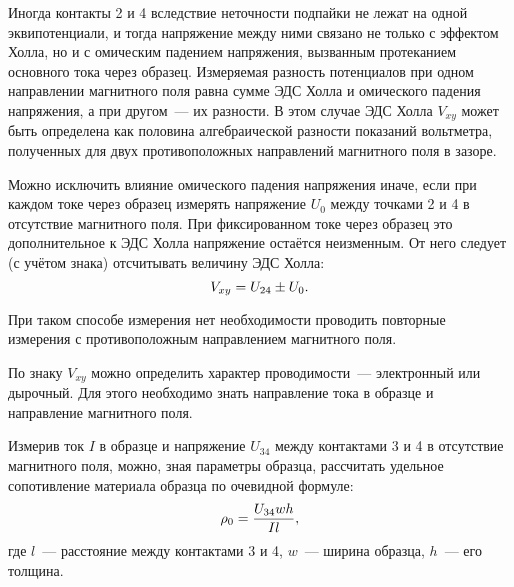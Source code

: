 Иногда контакты 2 и 4 вследствие неточности подпайки не лежат на одной эквипотенциали, и тогда напряжение между ними связано не только с эффектом Холла, но и с омическим падением напряжения, вызванным протеканием основного тока через образец. Измеряемая разность потенциалов при одном направлении магнитного поля равна сумме ЭДС Холла и омического падения напряжения, а при другом~--- их разности. В этом случае ЭДС Холла $V_{xy}$ может быть определена как половина алгебраической разности показаний вольтметра, полученных для двух противоположных направлений магнитного поля в зазоре.

Можно исключить влияние омического падения напряжения иначе, если при каждом токе через образец измерять
напряжение $U_0$ между точками 2 и 4 в отсутствие магнитного поля. При фиксированном токе через образец это
дополнительное к ЭДС Холла напряжение остаётся неизменным. От него следует (с учётом знака) отсчитывать величину
ЭДС Холла:
\begin{equation}
	V_{xy}=U_{24}\pm U_0.
	\eqmark{3.5.1}
\end{equation}

При таком способе измерения нет необходимости проводить повторные измерения с противоположным направлением магнитного поля.

По знаку $V_{xy}$ можно определить характер проводимости~--- электронный или дырочный. Для этого необходимо знать направление тока в образце и направление магнитного поля.

Измерив ток $I$ в образце и напряжение $U_{34}$ между контактами 3 и 4 в отсутствие магнитного поля, можно, зная
параметры образца, рассчитать удельное сопотивление материала образца по очевидной формуле:
\begin{equation}
	\rho_0=\frac{U_{34}wh}{Il},
	\eqmark{3.5.2}
\end{equation}
где $l$~--- расстояние между контактами 3 и 4, $w$~--- ширина образца, $h$~--- его толщина.

